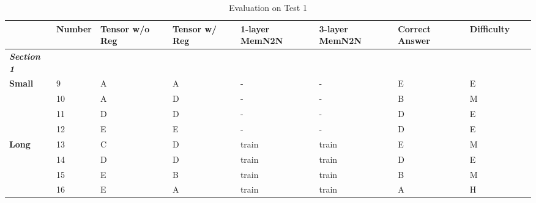 \documentclass[pageno]{jpaper}
\newcommand{\textbi}[1]{\textbf{\textit{#1}}}
\begin{document}
\begin{table}[]
\tiny
\centering
\caption{Evaluation on Test 1}
\label{Evaluation on Test 1}
\begin{tabularx}{\textwidth}{XXXXXXXXXX}
\toprule
                         & \textbf{Number} & \textbf{Tensor w/o Reg} & \textbf{Tensor w/ Reg} & \textbf{1-layer MemN2N} & \textbf{3-layer MemN2N} & \textbf{Correct Answer} & \textbf{Difficulty} \\ \midrule
\textbi{Section 1}       &                 &                         &                        &                         &                         &                         &                     \\ \midrule
\textbf{Small}           & 9               & A                       & A                      & -                       & -                       & E                       & E                   \\
\textbf{}                & 10              & A                       & D                      & -                       & -                       & B                       & M                   \\
\textbf{}                & 11              & D                       & D                      & -                       & -                       & D                       & E                   \\
\textbf{}                & 12              & E                       & E                      & -                       & -                       & D                       & E                   \\
\textbf{Long}            & 13              & C                       & D                      & train                   & train                   & E                       & M                   \\
\textbf{}                & 14              & D                       & D                      & train                   & train                   & D                       & E                   \\
\textbf{}                & 15              & E                       & B                      & train                   & train                   & B                       & M                   \\
\textbf{}                & 16              & E                       & A                      & train                   & train                   & A                       & H                   \\

\end{tabularx}
\end{table}
\end{document}
